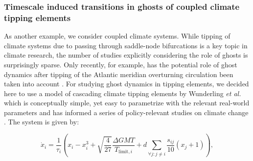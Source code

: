 \documentclass{article}
\theoremstyle{definition}
\begin{document}
\begin{refsection}
\subsubsection{Timescale induced transitions in ghosts of coupled climate tipping elements}

As another example, we consider coupled climate systems. While tipping of climate systems due to passing through saddle-node bifurcations is a key topic in climate research, the number of studies explicitly considering the role of ghosts is surprisingly sparse. Only recently, for example, has the potential role of ghost dynamics after tipping of the Atlantic meridian overturning circulation been taken into account \cite{Mehling2024,borner2025boundary}.
For studying ghost dynamics in tipping elements, we decided here to use a model of cascading climate tipping elements by Wunderling \textit{et al.} \cite{Wunderling2021} which is conceptually simple, yet easy to parametrize with the relevant real-world parameters and has informed a series of policy-relevant studies on climate change \cite{Wunderling2022,Moller2024}. The system is given by:

\begin{equation}
    \dot{x}_i = \frac{1}{\tau_i} \left( x_i - x_i^3 + \sqrt{\frac{4}{27}} \frac{\Delta GMT}{T_{\text{limit},i}} + d \sum_{ \forall j: j\neq i}  \frac{s_{ij}}{10}(x_j + 1) \right),\label{eq:Wunderling}
\end{equation}


\end{refsection}
\end{document}

